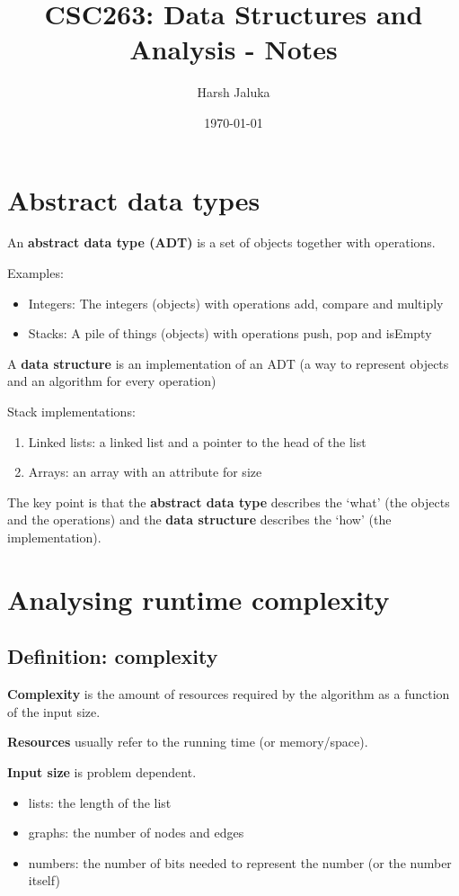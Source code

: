 \documentclass[11pt]{article}
\title{CSC263: Data Structures and Analysis - Notes}
\author{Harsh Jaluka}
\date{\today}
\begin{document}
\begin{titlepage}
\maketitle 
\end{titlepage}

\newpage
\tableofcontents

\newpage 
\section{Abstract data types}
An \textbf{abstract data type (ADT)} is a set of objects together with operations. 

Examples:
\begin{itemize}
    \item Integers: The integers (objects) with operations add, compare and multiply
    \item Stacks: A pile of things (objects) with operations push, pop and isEmpty
\end{itemize}

A \textbf{data structure} is an implementation of an ADT (a way to represent objects and an algorithm for every operation) 

Stack implementations: 
\begin{enumerate}
    \item Linked lists: a linked list and a pointer to the head of the list
    \item Arrays: an array with an attribute for size
\end{enumerate}
The key point is that the \textbf{abstract data type} describes the `what' (the objects and the operations) and the \textbf{data structure} describes the `how' (the implementation).

\newpage 
\section{Analysing runtime complexity}
\subsection{Definition: complexity}
\textbf{Complexity} is the amount of resources required by the algorithm as a function of the input size.

\textbf{Resources} usually refer to the running time (or memory/space). 

\textbf{Input size} is problem dependent. 
\begin{itemize}
    \item lists: the length of the list
    \item graphs: the number of nodes and edges 
    \item numbers: the number of bits needed to represent the number (or the number itself) 
\end{itemize}
\end{document}

